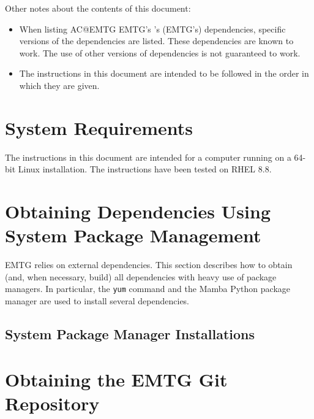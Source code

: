 \documentclass[11pt]{article}
\makeatletter
\newcommand{\acposs}[1]{%
	\expandafter\ifx\csname AC@#1\endcsname\AC@used
	\acs{#1}'s%
	\else
	\aclu{#1}'s (\acs{#1}'s)%
	\fi
}
\makeatother
\begin{document}
\noindent Other notes about the contents of this document:
\begin{itemize}
	\item When listing \acposs{EMTG} dependencies, specific versions of the dependencies are listed. These dependencies are known to work. The use of other versions of dependencies is not guaranteed to work.
	\item The instructions in this document are intended to be followed in the order in which they are given.
\end{itemize}

\section{System Requirements}
\label{sec:system_requirements}

The instructions in this document are intended for a computer running on a 64-bit Linux installation. The instructions have been tested on \ac{RHEL} 8.8.

\section{Obtaining Dependencies Using System Package Management}
\label{sec:setting_up_dependencies_with_management_capabilities}

\ac{EMTG} relies on external dependencies. This section describes how to obtain (and, when necessary, build) all dependencies with heavy use of package managers. In particular, the \texttt{yum} command and the Mamba Python package manager are used to install several dependencies.

\subsection{System Package Manager Installations}
\label{sec:yum_installations}



\section{Obtaining the EMTG Git Repository}
\label{sec:obtaining_emtg}


\end{document}
